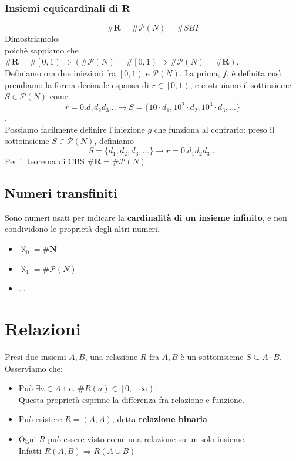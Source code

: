\documentclass{report}
\begin{document}
        \subsubsection{Insiemi equicardinali di $\mathbf{R}$}
            $$\#\mathbf{R} = \#\mathcal{P}\left(N\right)= \#SBI$$
            Dimostriamolo: \\
            poichè sappiamo che $\#\mathbf{R} = \#\left[0,1\right) \Longrightarrow 
            \left(\#\mathcal{P}\left(N\right) = \#\left[0, 1\right) \Longrightarrow \#\mathcal{P}\left(N\right) = \#\mathbf{R}\right)$. \\
            Definiamo ora due iniezioni fra $\left[0, 1\right)$ e $\mathcal{P}\left(N\right)$. 
            La prima, $f$, è definita così: prendiamo la forma decimale espansa di $r \in \left[0, 1\right)$, 
            e costruiamo il sottinsieme $S \in \mathcal{P}\left(N\right)$ come 
            $$r = 0.d_1d_2d_3... \rightarrow S = \{10 \cdot d_1, 10^2 \cdot d_2, 10^3 \cdot d_3, ...\}$$. \\
            Possiamo facilmente definire l'iniezione $g$ che funziona al contrario: preso il sottoinsieme $S \in \mathcal{P}\left(N\right)$,
            definiamo 
            $$S = \{d_1, d_2, d_3, ...\} \rightarrow r = 0.d_1d_2d_3...$$
            Per il teorema di CBS $\#\mathbf{R} =\#\mathcal{P}\left(N\right)$   
    \subsection{Numeri transfiniti}
        Sono numeri usati per indicare la \textbf{cardinalità di un insieme infinito}, e non condividono le proprietà degli altri numeri.
        \begin{itemize}
            \item $\aleph_0 = \#\mathbf{N}$
            \item $\aleph_1 = \#\mathcal{P}\left(N\right)$
            \item ...
        \end{itemize}
\newpage 
\section{Relazioni}
    Presi due insiemi $A, B$, una relazione $R$ fra $A, B$ è un sottoinsieme 
    $S \subseteq A \cdot B$.
    Osserviamo che:
    \begin{itemize}
        \item Può $\exists a \in A$ t.c. $\#R\left(a\right) \in \left[0, +\infty\right)$. \\
            Questa proprietà esprime la differenza fra relazione e funzione.
        \item Può esistere $R = \left(A,A\right)$, detta \textbf{relazione binaria}
        \item Ogni $R$ può essere visto come una relazione su un solo insieme. \\
            Infatti $R\left(A,B\right) \Longrightarrow R\left(A\cup B\right)$
    \end{itemize}
\end{document}
